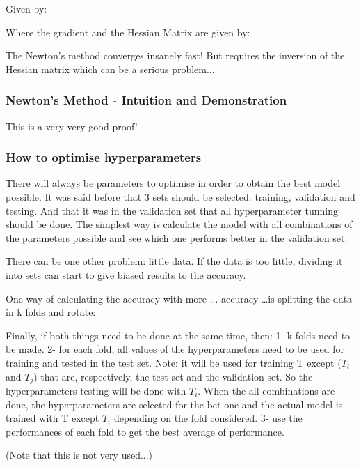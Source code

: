 Given by:


Where the gradient and the Hessian Matrix are given by:


The Newton's method converges insanely fast! But requires the inversion of the Hessian matrix which can be a serious problem...


\subsubsection{Newton's Method - Intuition and Demonstration}
This is a very very good proof!



\subsubsection{How to optimise hyperparameters}
There will always be parameters to optimise in order to obtain the best model possible.
It was said before that 3 sets should be selected: training, validation and testing.
And that it was in the validation set that all hyperparameter tunning should be done.
The simplest way is calculate the model with all combinations of the parameters possible and see which one performs better in the validation set. 

There can be one other problem: little data. If the data is too little, dividing it into sets can start to give biased results to the accuracy.

One way of calculating the accuracy with more ... accuracy \dots is splitting the data in k folds and rotate:




Finally, if both things need to be done at the same time, then:
1- k folds need to be made. 
2- for each fold, all values of the hyperparameters need to be used for training and tested in the test set.
Note: it will be used for training T except ($T_i$ and $T_j$) that are, respectively, the test set and the validation set. So the hyperparameters testing will be done with $T_i$.
When the all combinations are done, the hyperparameters are selected for the bet one and the actual model is trained with T except $T_i$ depending on the fold considered.
3- use the performances of each fold to get the best average of performance.

(Note that this is not very used...)








